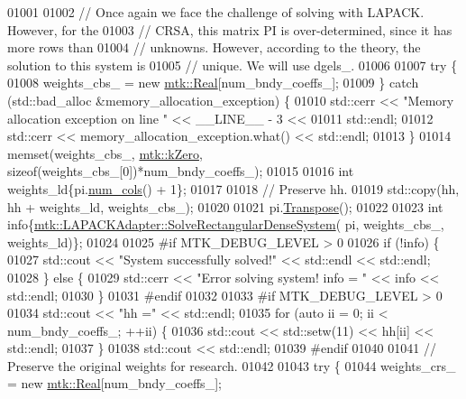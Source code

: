 \begin{DoxyCode}
{{01001 
01002   \textcolor{comment}{// Once again we face the challenge of solving with LAPACK. However, for the}
01003   \textcolor{comment}{// CRSA, this matrix PI is over-determined, since it has more rows than}
01004   \textcolor{comment}{// unknowns. However, according to the theory, the solution to this system is}
01005   \textcolor{comment}{// unique. We will use dgels\_.}
01006 
01007   \textcolor{keywordflow}{try} \{
01008     weights\_cbs\_ = \textcolor{keyword}{new} \hyperlink{group__c01-roots_gac080bbbf5cbb5502c9f00405f894857d}{mtk::Real}[num\_bndy\_coeffs\_];
01009   \} \textcolor{keywordflow}{catch} (std::bad\_alloc &memory\_allocation\_exception) \{
01010     std::cerr << \textcolor{stringliteral}{"Memory allocation exception on line "} << \_\_LINE\_\_ - 3 <<
01011       std::endl;
01012     std::cerr << memory\_allocation\_exception.what() << std::endl;
01013   \}
01014   memset(weights\_cbs\_, \hyperlink{group__c01-roots_ga59a451a5fae30d59649bcda274fea271}{mtk::kZero}, \textcolor{keyword}{sizeof}(weights\_cbs\_[0])*num\_bndy\_coeffs\_);
01015 
01016   \textcolor{keywordtype}{int} weights\_ld\{pi.\hyperlink{classmtk_1_1DenseMatrix_af6f78373aaf2136f0c78974d7c8de0a8}{num\_cols}() + 1\};
01017 
01018   \textcolor{comment}{// Preserve hh.}
01019   std::copy(hh, hh + weights\_ld, weights\_cbs\_);
01020 
01021   pi.\hyperlink{classmtk_1_1DenseMatrix_a71d9c07ca66e88d97d1fd5012f43138b}{Transpose}();
01022 
01023   \textcolor{keywordtype}{int} info\{\hyperlink{classmtk_1_1LAPACKAdapter_a380f148ffdf96bae2f79ae28f1a6560c}{mtk::LAPACKAdapter::SolveRectangularDenseSystem}(
      pi, weights\_cbs\_, weights\_ld)\};
01024 
01025 \textcolor{preprocessor}{  #if MTK\_DEBUG\_LEVEL > 0}
01026   \textcolor{keywordflow}{if} (!info) \{
01027     std::cout << \textcolor{stringliteral}{"System successfully solved!"} << std::endl << std::endl;
01028   \} \textcolor{keywordflow}{else} \{
01029     std::cerr << \textcolor{stringliteral}{"Error solving system! info = "} << info << std::endl;
01030   \}
01031 \textcolor{preprocessor}{  #endif}
01032 
01033 \textcolor{preprocessor}{  #if MTK\_DEBUG\_LEVEL > 0}
01034   std::cout << \textcolor{stringliteral}{"hh ="} << std::endl;
01035   \textcolor{keywordflow}{for} (\textcolor{keyword}{auto} ii = 0; ii < num\_bndy\_coeffs\_; ++ii) \{
01036     std::cout << std::setw(11) << hh[ii] << std::endl;
01037   \}
01038   std::cout << std::endl;
01039 \textcolor{preprocessor}{  #endif}
01040 
01041   \textcolor{comment}{// Preserve the original weights for research.}
01042 
01043   \textcolor{keywordflow}{try} \{
01044     weights\_crs\_ = \textcolor{keyword}{new} \hyperlink{group__c01-roots_gac080bbbf5cbb5502c9f00405f894857d}{mtk::Real}[num\_bndy\_coeffs\_];
}}
\end{DoxyCode}
